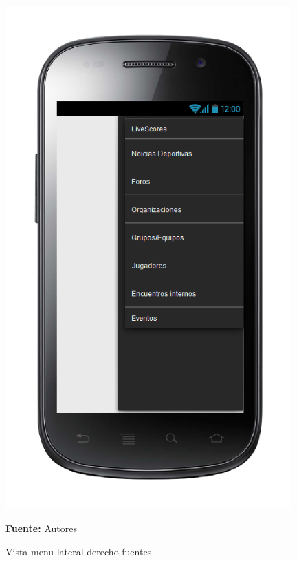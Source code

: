 \begin{figure}[!htb]
  \begin{center}
\includegraphics[width=11cm]{./imagenes/UI/Noticias/menu_lateral_derecho_fuentes.png}
    \caption{Vista menu lateral derecho fuentes}
    \label{fig:Vista_menu_lateral_derecho_fuentes}
    \textbf{Fuente:}  Autores
  \end{center}
\end{figure}
